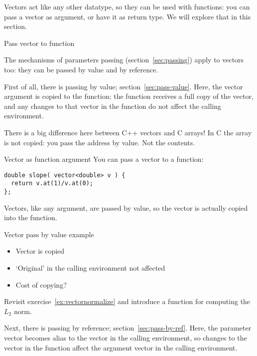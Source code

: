 Vectors act like any other datatype, so they can be used with functions:
you can pass a vector as argument, or have it as return type.
We will explore that in this section.

 {Pass vector to function}

The mechanisms of parameters passing (section~\ref{sec:passing})
apply to vectors too: they can be passed by value and by reference.

First of all, there is passing by value; section~\ref{sec:pass-value}.
Here, the vector argument is copied to the function;
the function receives a full copy of the vector,
and any changes to that vector in the function
do not affect the calling environment.

\begin{cnote}
  There is a big difference here between C++ vectors and C arrays!
  In C the array is not copied: you pass the address by value. Not the contents.
\end{cnote}

\begin{slide}{Vector as function argument}
  \label{sl:vector-arg}
  You can pass a vector to a function:
\begin{lstlisting}
double slope( vector<double> v ) {
  return v.at(1)/v.at(0);
};
\end{lstlisting}
Vectors, like any argument, are passed by value, so the vector is
actually copied into the function.
\end{slide}

\begin{block}{Vector pass by value example}
  \label{sl:vector-arg-ex}
  \begin{itemize}
  \item Vector is copied
  \item `Original' in the calling environment not affected
  \item Cost of copying?
  \end{itemize}
\end{block}

\begin{exercise}
  \label{ex:vectornormalize-function}
  Revisit exercise~\ref{ex:vectornormalize} and introduce a function
  for computing the $L_2$ norm.
\end{exercise}

Next, there is passing by reference; section~\ref{sec:pass-by-ref}.
Here, the parameter vector becomes alias to the vector in the calling environment,
so changes to the vector in the function affect the argument vector
in the calling environment.

